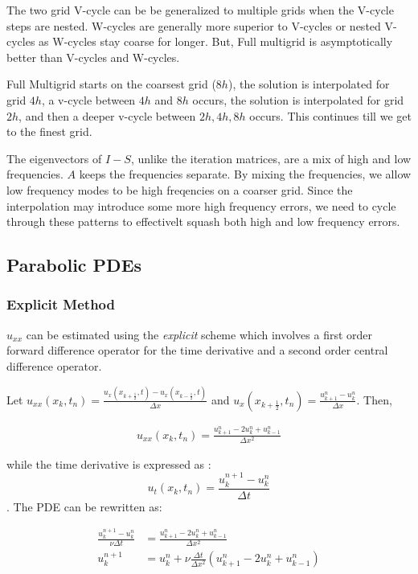 \documentclass[12pt]{article}
\begin{document}
The two grid V-cycle can be be generalized to multiple grids when the V-cycle steps are nested. W-cycles are generally more superior to V-cycles or nested V-cycles as W-cycles stay coarse for longer. But, Full multigrid is asymptotically better than V-cycles and W-cycles.

Full Multigrid starts on the coarsest grid ($8h$), the solution is interpolated for grid $4h$,  a v-cycle between $4h$ and $8h$ occurs, the solution is interpolated for grid $2h$, and then a deeper v-cycle between $2h, 4h, 8h$ occurs. This continues till we get to the finest grid.

The eigenvectors of $I - S$, unlike the iteration matrices, are a mix of high and low frequencies. $A$ keeps the frequencies separate. By mixing the frequencies, we allow low frequency modes to be high freqencies on a coarser grid. Since the interpolation may introduce some more high frequency errors, we need to cycle through these patterns to effectivelt squash both high and low frequency errors. 

\subsection{Parabolic PDEs}

\subsubsection{Explicit Method}

$u_{xx}$ can be estimated using the \textit{explicit} scheme which involves a first order forward difference operator for the time derivative and a second order central difference operator.

Let $u_{xx}(x_k, t_n) = \frac{u_{x}\left(x_{k + \frac{1}{2}}, t\right) - u_{x}\left(x_{k - \frac{1}{2}}, t\right)}{\Delta x}$ and $u_{x}\left(x_{k + \frac{1}{2}}, t_n\right) = \frac{u^n_{k + 1} - u^n_{k}}{\Delta x}$. Then,

\begin{align*}
    u_{xx}(x_k, t_n) = \frac{u_{k + 1}^n - 2u_k^n + u^n_{k - 1}}{\Delta x^2}
\end{align*}

while the time derivative is expressed as : $$u_t(x_k, t_n) = \frac{u^{n + 1}_{k} - u^n_{k}}{\Delta t}$$. The PDE can be rewritten as:

\begin{align*}
    \frac{u^{n + 1}_{k} - u^n_{k}}{\nu \Delta t} &=  \frac{u_{k + 1}^n - 2u_k^n + u^n_{k - 1}}{\Delta x^2} \\
    u^{n + 1}_{k} &= u^n_{k} + \nu \frac{\Delta t}{\Delta x^2}\left(u_{k + 1}^n - 2u_k^n + u^n_{k - 1}\right)
\end{align*}
\end{document}
